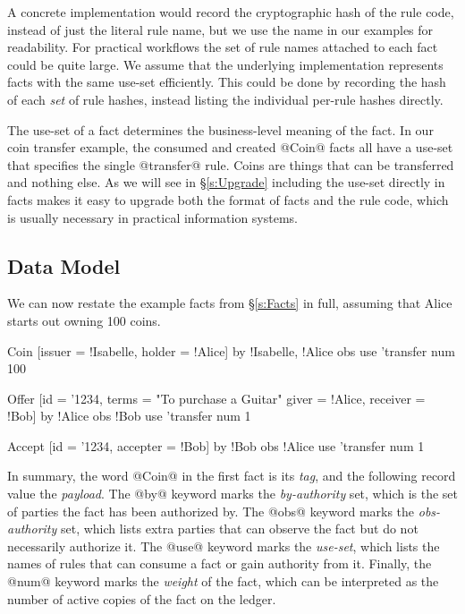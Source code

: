 A concrete implementation would record the cryptographic hash of the rule code, instead of just the literal rule name, but we use the name in our examples for readability. For practical workflows the set of rule names attached to each fact could be quite large. We assume that the underlying implementation represents facts with the same use-set efficiently. This could be done by recording the hash of each \emph{set} of rule hashes, instead listing the individual per-rule hashes directly.

\eject{}
The use-set of a fact determines the business-level meaning of the fact. In our coin transfer example, the consumed and created @Coin@ facts all have a use-set that specifies the single @transfer@ rule. Coins are things that can be transferred and nothing else. As we will see in \S\ref{s:Upgrade} including the use-set directly in facts makes it easy to upgrade both the format of facts and the rule code, which is usually necessary in practical information systems.


\subsection{Data Model}
\label{s:NowWithMetadata}
\label{s:DataModel}
We can now restate the example facts from \S\ref{s:Facts} in full, assuming that Alice starts out owning 100 coins.
\begin{small}
\begin{code}
 Coin   [issuer = !Isabelle, holder  = !Alice]
    by  {!Isabelle, !Alice}  obs {}
    use {'transfer}          num 100

 Offer  [id = '1234, terms = "To purchase a Guitar"
         giver = !Alice, receiver = !Bob]
    by  {!Alice}             obs {!Bob}
    use {'transfer}          num 1

 Accept [id = '1234, accepter = !Bob]
    by  {!Bob}               obs {!Alice}
    use {'transfer}          num 1
\end{code}
\end{small}
In summary, the word @Coin@ in the first fact is its \emph{tag}, and the following record value the \emph{payload}. The @by@ keyword marks the \emph{by-authority} set, which is the set of parties the fact has been authorized by. The @obs@ keyword marks the \emph{obs-authority} set, which lists extra parties that can observe the fact but do not necessarily authorize it. The @use@ keyword marks the \emph{use-set}, which lists the names of rules that can consume a fact or gain authority from it. Finally, the @num@ keyword marks the \emph{weight} of the fact, which can be interpreted as the number of active copies of the fact on the ledger.

